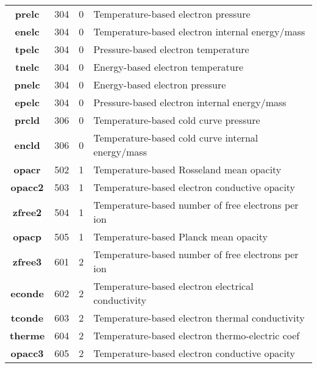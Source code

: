 \documentclass[11pt]{nmemo}
\begin{document}
\begin{table}[!ht]
\begin{center}
\begin{tabularx}{0.9\linewidth}{CDDL}
            
        \textbf{prelc} & 304 & 0 & Temperature-based electron pressure\\
        \textbf{enelc} & 304 & 0 & Temperature-based electron internal energy/mass\\
        \textbf{tpelc} & 304 & 0 & Pressure-based electron temperature\\
        \textbf{tnelc} & 304 & 0 & Energy-based electron temperature\\
        \textbf{pnelc} & 304 & 0 & Energy-based electron pressure\\
        \textbf{epelc} & 304 & 0 & Pressure-based electron internal energy/mass\\
          
            
        \textbf{prcld} & 306 & 0 & Temperature-based cold curve pressure\\
        \textbf{encld} & 306 & 0 & Temperature-based cold curve internal energy/mass\\
            
            
            \textbf{opacr}  & 502 & 1 & Temperature-based Rosseland mean opacity\\
            \textbf{opacc2} & 503 & 1 & Temperature-based electron conductive opacity\\
            \textbf{zfree2} & 504 & 1 & Temperature-based number of free electrons per ion\\
            \textbf{opacp}  & 505 & 1 & Temperature-based Planck mean opacity\\
            
            
            \textbf{zfree3} & 601 & 2 & Temperature-based number of free electrons per ion\\
            \textbf{econde} & 602 & 2 & Temperature-based electron electrical conductivity\\
            \textbf{tconde} & 603 & 2 & Temperature-based electron thermal conductivity\\
            \textbf{therme} & 604 & 2 & Temperature-based electron thermo-electric coef\\
            \textbf{opacc3} & 605 & 2 & Temperature-based electron conductive opacity\\
            

\end{tabularx}
\end{center}
\end{table}
\end{document}
